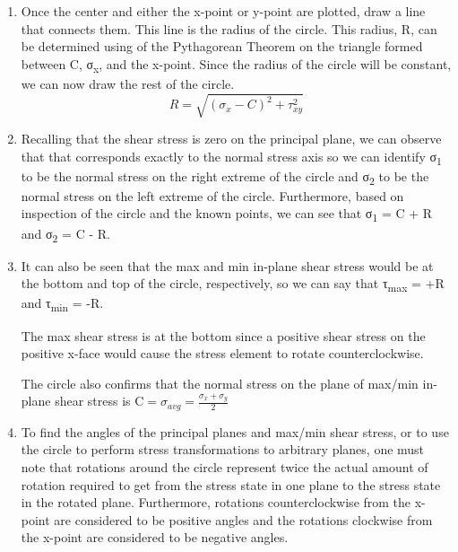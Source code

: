 \documentclass[
  letterpaper,
  DIV=11,
  numbers=noendperiod]{scrreprt}
\theoremstyle{definition}
\theoremstyle{remark}
\begin{document}
\begin{enumerate}
\def\labelenumi{\arabic{enumi}.}
\setcounter{enumi}{3}
\item
  Once the center and either the x-point or y-point are plotted, draw a
  line that connects them. This line is the radius of the circle. This
  radius, R, can be determined using of the Pythagorean Theorem on the
  triangle formed between C, σ\textsubscript{x}, and the x-point. Since
  the radius of the circle will be constant, we can now draw the rest of
  the circle.\\
  \[
  R=\sqrt{\left(\sigma_x-C\right)^2+\tau_{x y}^2}
  \]
\item
  Recalling that the shear stress is zero on the principal plane, we can
  observe that that corresponds exactly to the normal stress axis so we
  can identify σ\textsubscript{1} to be the normal stress on the right
  extreme of the circle and σ\textsubscript{2} to be the normal stress
  on the left extreme of the circle. Furthermore, based on inspection of
  the circle and the known points, we can see that σ\textsubscript{1} =
  C + R and σ\textsubscript{2} = C - R.
\item
  It can also be seen that the max and min in-plane shear stress would
  be at the bottom and top of the circle, respectively, so we can say
  that τ\textsubscript{max} = +R and τ\textsubscript{min} = -R.

  The max shear stress is at the bottom since a positive shear stress on
  the positive x-face would cause the stress element to rotate
  counterclockwise.

  The circle also confirms that the normal stress on the plane of
  max/min in-plane shear stress is
  \(\mathrm{C}=\sigma_{avg}=\frac{\sigma_x+\sigma_y}{2}\)
\item
  To find the angles of the principal planes and max/min shear stress,
  or to use the circle to perform stress transformations to arbitrary
  planes, one must note that rotations around the circle represent twice
  the actual amount of rotation required to get from the stress state in
  one plane to the stress state in the rotated plane. Furthermore,
  rotations counterclockwise from the x-point are considered to be
  positive angles and the rotations clockwise from the x-point are
  considered to be negative angles.


\end{enumerate}
\end{document}
